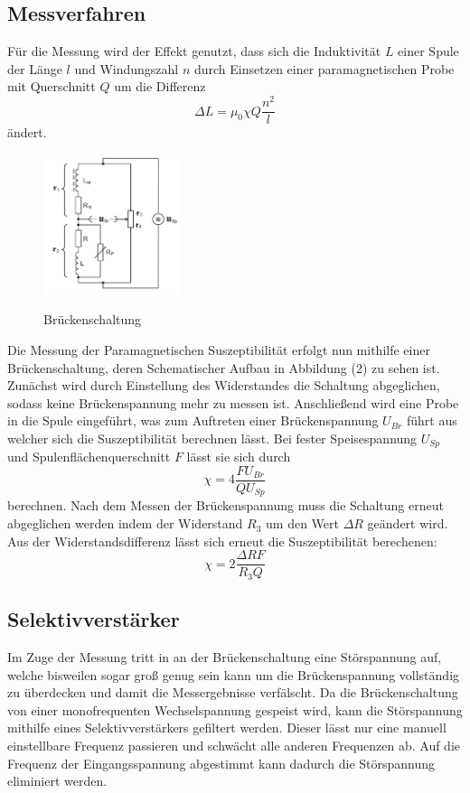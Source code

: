 \subsection{Messverfahren}
Für die Messung wird der Effekt genutzt, dass sich die Induktivität $L$ einer Spule der Länge $l$ und Windungszahl $n$ durch Einsetzen einer paramagnetischen Probe mit Querschnitt $Q$ um die Differenz
\begin{equation*}
\Delta L=\mu_0 \chi Q \frac{n^2}{l}
\end{equation*}
ändert. 
\begin{figure}[h]
    \centering
    \includegraphics[width=4cm, keepaspectratio]{Brückenschaltung}
    \label{Brückenschaltung}
    \caption{Brückenschaltung}
  \end{figure}
Die Messung der Paramagnetischen Suszeptibilität erfolgt nun mithilfe einer Brückenschaltung, deren Schematischer Aufbau in Abbildung (2) zu sehen ist. Zunächst wird durch Einstellung des Widerstandes die Schaltung  abgeglichen, sodass keine Brückenspannung mehr zu messen ist. Anschließend wird eine Probe in die Spule eingeführt, was zum Auftreten einer Brückenspannung $U_{Br}$ führt aus welcher sich die Suszeptibilität berechnen lässt. Bei fester Speisespannung $U_{Sp}$ und Spulenflächenquerschnitt $F$ lässt sie sich durch
\begin{equation}
\chi=4\frac{FU_{Br}}{QU_{Sp}}
\end{equation}
berechnen. Nach dem Messen der Brückenspannung muss die Schaltung erneut abgeglichen werden indem der Widerstand $R_3$ um den Wert $\Delta R$ geändert wird. Aus der Widerstandsdifferenz lässt sich erneut die Suszeptibilität berechenen:
\begin{equation}
\chi=2\frac{\Delta R F}{R_3 Q}
\end{equation}
\subsection{Selektivverstärker}
Im Zuge der Messung tritt in an der Brückenschaltung eine Störspannung auf, welche bisweilen sogar groß genug sein kann um die Brückenspannung vollständig zu überdecken und damit die Messergebnisse verfälscht. Da die Brückenschaltung von einer monofrequenten Wechselspannung gespeist wird, kann die Störspannung mithilfe eines Selektivverstärkers gefiltert werden. Dieser lässt nur eine manuell einstellbare Frequenz passieren und schwächt alle anderen Frequenzen ab. Auf die Frequenz der Eingangsspannung abgestimmt kann dadurch die Störspannung eliminiert werden. 
